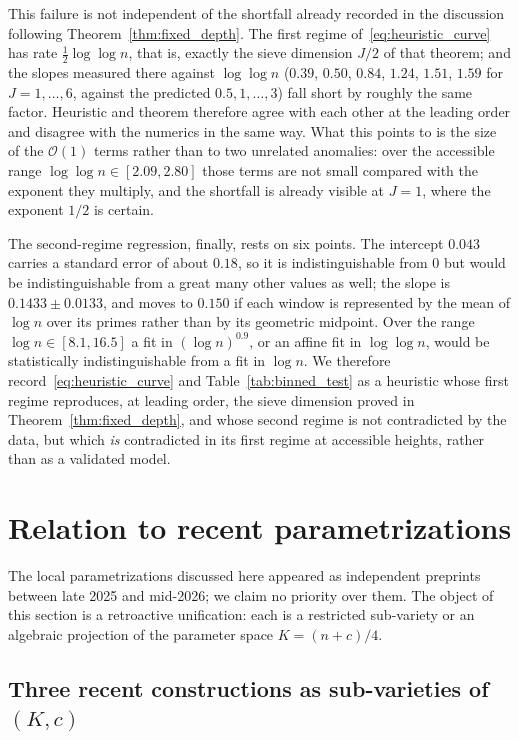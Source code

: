 \documentclass[11pt, a4paper]{article}
\theoremstyle{plain}
\theoremstyle{definition}
\begin{document}
This failure is not independent of the shortfall already recorded in the discussion following Theorem~\ref{thm:fixed_depth}. The first regime of~\eqref{eq:heuristic_curve} has rate $\tfrac12\log\log n$, that is, exactly the sieve dimension $J/2$ of that theorem; and the slopes measured there against $\log\log n$ ($0.39$, $0.50$, $0.84$, $1.24$, $1.51$, $1.59$ for $J=1,\ldots,6$, against the predicted $0.5,1,\ldots,3$) fall short by roughly the same factor. Heuristic and theorem therefore agree with each other at the leading order and disagree with the numerics in the same way. What this points to is the size of the $\mathcal{O}(1)$ terms rather than to two unrelated anomalies: over the accessible range $\log\log n\in[2.09,2.80]$ those terms are not small compared with the exponent they multiply, and the shortfall is already visible at $J=1$, where the exponent $1/2$ is certain.

The second-regime regression, finally, rests on six points. The intercept $0.043$ carries a standard error of about $0.18$, so it is indistinguishable from $0$ but would be indistinguishable from a great many other values as well; the slope is $0.1433\pm0.0133$, and moves to $0.150$ if each window is represented by the mean of $\log n$ over its primes rather than by its geometric midpoint. Over the range $\log n\in[8.1,16.5]$ a fit in $(\log n)^{0.9}$, or an affine fit in $\log\log n$, would be statistically indistinguishable from a fit in $\log n$. We therefore record~\eqref{eq:heuristic_curve} and Table~\ref{tab:binned_test} as a heuristic whose first regime reproduces, at leading order, the sieve dimension proved in Theorem~\ref{thm:fixed_depth}, and whose second regime is not contradicted by the data, but which \emph{is} contradicted in its first regime at accessible heights, rather than as a validated model.

\section{Relation to recent parametrizations} \label{sec:6}

The local parametrizations discussed here appeared as independent preprints between late 2025 and mid-2026; we claim no priority over them. The object of this section is a retroactive unification: each is a restricted sub-variety or an algebraic projection of the parameter space $K=(n+c)/4$.

\subsection{Three recent constructions as sub-varieties of $(K,c)$} \label{subsec:tame_subvariety}
\end{document}
